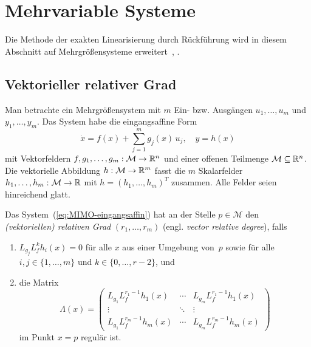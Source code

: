 \section{Mehrvariable Systeme\label{sec:Mehrvariable-Systeme}}

Die Methode der exakten Linearisierung durch Rückführung wird in diesem
Abschnitt auf Mehrgrößensysteme erweitert~\cite[Kapitel~5]{isidori3},
\cite[Abschnitt~{6.5.2}]{kwatny2000}.

\subsection{Vektorieller relativer Grad\label{subsec:Vektorieller-relativer-Grad}}

Man betrachte ein Mehrgrößensystem mit $m$ Ein- bzw. Ausgängen $u_{1},\ldots,u_{m}$
und $y_{1},\ldots,y_{m}$. Das System habe die eingangsaffine Form
\begin{equation}
\dot{x}=f(x)+\sum_{j=1}^{m}g_{j}(x)\,u_{j},\quad y=h(x)\label{eq:MIMO-eingangsaffin}
\end{equation}
mit Vektorfeldern $f,g_{1},\ldots,g_{m}:\mathcal{M}\to{\mathbb{R}}^{n}$ und
einer offenen Teilmenge $\mathcal{M}\subseteq{\mathbb{R}}^{n}$. Die vektorielle
Abbildung $h:\mathcal{M}\to{\mathbb{R}}^{m}$ fasst die $m$ Skalarfelder $h_{1},\ldots,h_{m}:\mathcal{M}\to{\mathbb{R}}$
mit $h=(h_{1},\ldots,h_{m})^{T}$ zusammen. Alle Felder seien hinreichend
glatt. 

\begin{definition}
\label{def:relativer-Grad-MIMO}Das System~(\ref{eq:MIMO-eingangsaffin})
hat an der Stelle $p\in\mathcal{M}$ den \emph{(vektoriellen) relativen
Grad} $(r_{1},\ldots,r_{m})$ (engl. \emph{vector relative degree}),
falls

\begin{enumerate}
\item $L_{g_{j}}L_{f}^{k}h_{i}(x)=0$ für alle $x$ aus einer Umgebung von~$p$
sowie für alle $i,j\in\{1,\ldots,m\}$ und $k\in\{0,\ldots,r-2\}$,
und
\item die Matrix
\[
\Lambda(x)=\left(\begin{array}{ccc}
L_{g_{1}}L_{f}^{r_{1}-1}h_{1}(x) & \cdots & L_{g_{m}}L_{f}^{r_{1}-1}h_{1}(x)\\
\vdots & \ddots & \vdots\\
L_{g_{1}}L_{f}^{r_{m}-1}h_{m}(x) & \cdots & L_{g_{m}}L_{f}^{r_{m}-1}h_{m}(x)
\end{array}\right)
\]
im Punkt $x=p$ regulär ist.
\end{enumerate}
\end{definition}

